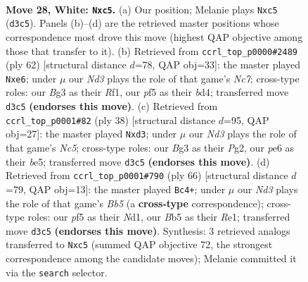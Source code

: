 \documentclass[11pt]{article}
\begin{document}
\clearpage

\begin{figure}[p]\centering
\begin{subfigure}{0.46\textwidth}\centering
\resizebox{\linewidth}{!}{%
\newchessgame
\chessboard[
  setfen={rn4k1/8/1p2p3/1Bbb1p1p/4r3/3N2BP/PRR2P2/6K1 w - - 3 28},
  showmover=false,
  pgfstyle=straightmove, color=movearrow, markmove={d3-c5}
]}
\caption{}
\end{subfigure}\hfill
\begin{subfigure}{0.46\textwidth}\centering
\resizebox{\linewidth}{!}{%
\newchessgame
\chessboard[
  setfen={1rr4k/2N2p1p/2R1b1p1/1P2p3/3bP3/3B2P1/5P2/5RK1 w - - 1 32},
  showmover=false,
  pgfstyle=straightmove, color=movearrow, markmove={c7-e6}
]}
\caption{}
\end{subfigure}
\\[4pt]
\begin{subfigure}{0.46\textwidth}\centering
\resizebox{\linewidth}{!}{%
\newchessgame
\chessboard[
  setfen={3r1rk1/p1p4p/1np3p1/2N1b3/8/3bB2P/PP3PP1/3R1RK1 w - - 0 20},
  showmover=false,
  pgfstyle=straightmove, color=movearrow, markmove={c5-d3}
]}
\caption{}
\end{subfigure}\hfill
\begin{subfigure}{0.46\textwidth}\centering
\resizebox{\linewidth}{!}{%
\newchessgame
\chessboard[
  setfen={2r1r3/1p1b1kp1/1Bn2b1p/PB6/5p2/2P5/4R1PP/3NR1K1 w - - 2 34},
  showmover=false,
  pgfstyle=straightmove, color=movearrow, markmove={b5-c4}
]}
\caption{}
\end{subfigure}
\caption{\textbf{Move 28, White: \texttt{Nxc5}.} (a) Our position; Melanie plays \texttt{Nxc5} (\texttt{d3c5}). Panels (b)--(d) are the retrieved master positions whose correspondence most drove this move (highest QAP objective among those that transfer to it). (b) Retrieved from \texttt{ccrl\_top\_p0000\#2489} (ply 62) [structural distance $d$=78, QAP obj=33]: the master played \texttt{Nxe6}; under $\mu$ our \emph{Nd3} plays the role of that game's \emph{Nc7}; cross-type roles: our \emph{B}g3 as their \emph{R}f1, our \emph{p}f5 as their \emph{b}d4; transferred move \texttt{d3c5} \textbf{(endorses this move)}. (c) Retrieved from \texttt{ccrl\_top\_p0001\#82} (ply 38) [structural distance $d$=95, QAP obj=27]: the master played \texttt{Nxd3}; under $\mu$ our \emph{Nd3} plays the role of that game's \emph{Nc5}; cross-type roles: our \emph{B}g3 as their \emph{P}g2, our \emph{p}e6 as their \emph{b}e5; transferred move \texttt{d3c5} \textbf{(endorses this move)}. (d) Retrieved from \texttt{ccrl\_top\_p0001\#790} (ply 66) [structural distance $d$=79, QAP obj=13]: the master played \texttt{Bc4+}; under $\mu$ our \emph{Nd3} plays the role of that game's \emph{Bb5} (a \textbf{cross-type} correspondence); cross-type roles: our \emph{p}f5 as their \emph{N}d1, our \emph{B}b5 as their \emph{R}e1; transferred move \texttt{d3c5} \textbf{(endorses this move)}. Synthesis: 3 retrieved analogs transferred to \texttt{Nxc5} (summed QAP objective 72, the strongest correspondence among the candidate moves); Melanie committed it via the \texttt{search} selector.}
\label{fig:thought-m54}
\end{figure}
\end{document}
